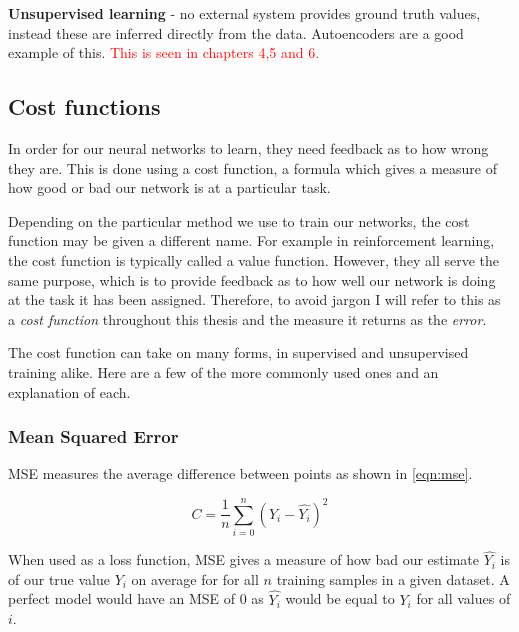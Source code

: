 \textbf{Unsupervised learning} - no external system provides ground truth values, instead these are inferred directly from the data. Autoencoders are a good example of this.  \textcolor{red}{This is seen in chapters 4,5 and 6.}




\subsection{Cost functions}
In order for our neural networks to learn, they need feedback as to how wrong they are. This is done using a cost function, a formula which gives a measure of how good or bad our network is at a particular task.

Depending on the particular method we use to train our networks, the cost function may be given a different name. For example in reinforcement learning, the cost function is typically called a value function. However, they all serve the same purpose, which is to provide feedback as to how well our network is doing at the task it has been assigned. Therefore, to avoid jargon I will refer to this as a \textit{cost function} throughout this thesis and the measure it returns as the \textit{error}.

The cost function can take on many forms, in supervised and unsupervised training alike. Here are a few of the more commonly used ones and an explanation of each.

\subsubsection{Mean Squared Error}
\ac{MSE} measures the average difference between points as shown in \autoref{eqn:mse}.

\begin{equation} \label{eqn:mse}
C = \frac{1}{n}\sum_{i=0}^{n} (Y_i - \hat{Y_i})^2
\end{equation}

When used as a loss function, \ac{MSE} gives a measure of how bad our estimate $\hat{Y_i}$ is of our true value $Y_i$ on average for for all $n$ training samples in a given dataset. A perfect model would have an \ac{MSE} of 0 as $\hat{Y_i}$ would be equal to $Y_i$ for all values of $i$.

